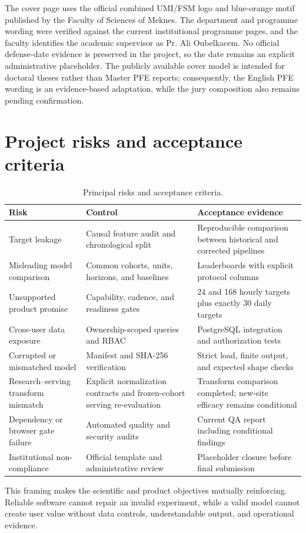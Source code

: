 The cover page uses the official combined UMI/FSM logo and blue-orange motif published by the Faculty of Sciences of Meknes. The department and programme wording were verified against the current institutional programme pages, and the faculty identifies the academic supervisor as Pr. Ali Oubelkacem. No official defense-date evidence is preserved in the project, so the date remains an explicit administrative placeholder. The publicly available cover model is intended for doctoral theses rather than Master PFE reports; consequently, the English PFE wording is an evidence-based adaptation, while the jury composition also remains pending confirmation.

\section{Project risks and acceptance criteria}

\begin{table}[H]
\centering
\caption{Principal risks and acceptance criteria.}
\label{tab:risks}
\begin{tabularx}{\textwidth}{p{}YY}
\toprule
Risk & Control & Acceptance evidence \\
\midrule
Target leakage & Causal feature audit and chronological split & Reproducible comparison between historical and corrected pipelines \\
Misleading model comparison & Common cohorts, units, horizons, and baselines & Leaderboards with explicit protocol columns \\
Unsupported product promise & Capability, cadence, and readiness gates & 24 and 168 hourly targets plus exactly 30 daily targets \\
Cross-user data exposure & Ownership-scoped queries and RBAC & PostgreSQL integration and authorization tests \\
Corrupted or mismatched model & Manifest and SHA-256 verification & Strict load, finite output, and expected shape checks \\
Research--serving transform mismatch & Explicit normalization contracts and frozen-cohort serving re-evaluation & Transform comparison completed; new-site efficacy remains conditional \\
Dependency or browser gate failure & Automated quality and security audits & Current QA report including conditional findings \\
Institutional non-compliance & Official template and administrative review & Placeholder closure before final submission \\
\bottomrule
\end{tabularx}
\end{table}

This framing makes the scientific and product objectives mutually reinforcing. Reliable software cannot repair an invalid experiment, while a valid model cannot create user value without data controls, understandable output, and operational evidence.

